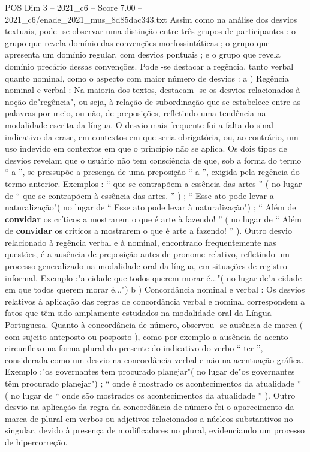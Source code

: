 \begin{textsample}{POS Dim 3 – 2021\_c6 – Score 7.00 – 2021\_c6/enade\_2021\_mus\_8d85dac343.txt}
Assim como na análise dos desvios textuais, pode -se observar uma distinção entre três grupos de participantes : o grupo que revela domínio das convenções morfossintáticas ; o grupo que apresenta um domínio regular, com desvios pontuais ; e o grupo que revela domínio precário dessas convenções.
Pode -se destacar a regência, tanto verbal quanto nominal, como o aspecto com maior número de desvios : a ) Regência nominal e verbal : Na maioria dos textos, destacam -se os desvios relacionados à noção de"regência", ou seja, à relação de subordinação que se estabelece entre as palavras por meio, ou não, de preposições, refletindo uma tendência na modalidade escrita da língua.
O desvio mais frequente foi a falta do sinal indicativo da crase, em contextos em que seria obrigatória, ou, ao contrário, um uso indevido em contextos em que o princípio não se aplica.
Os dois tipos de desvios revelam que o usuário não tem consciência de que, sob a forma do termo “ a ”, se pressupõe a presença de uma preposição “ a ”, exigida pela regência do termo anterior.
Exemplos : “ que se contrapõem a essência das artes ” ( no lugar de “ que se contrapõem à essência das artes. ” ) ; “ Esse ato pode levar a naturalização"( no lugar de “ Esse ato pode levar à naturalização") ; “ Além de \textbf{convidar} os críticos a mostrarem o que é arte à fazendo! ” ( no lugar de “ Além de \textbf{convidar} os críticos a mostrarem o que é arte a fazendo! ” ).
Outro desvio relacionado à regência verbal e à nominal, encontrado frequentemente nas questões, é a ausência de preposição antes de pronome relativo, refletindo um processo generalizado na modalidade oral da língua, em situações de registro informal.
Exemplo :"a cidade que todos querem morar é..."( no lugar de"a cidade em que todos querem morar é...") b ) Concordância nominal e verbal : Os desvios relativos à aplicação das regras de concordância verbal e nominal correspondem a fatos que têm sido amplamente estudados na modalidade oral da Língua Portuguesa.
Quanto à concordância de número, observou -se ausência de marca ( com sujeito anteposto ou posposto ), como por exemplo a ausência de acento circunflexo na forma plural do presente do indicativo do verbo “ ter ”, considerada como um desvio na concordância verbal e não na acentuação gráfica.
Exemplo :"os governantes tem procurado planejar"( no lugar de"os governantes têm procurado planejar") ; “ onde é mostrado os acontecimentos da atualidade ” ( no lugar de “ onde são mostrados os acontecimentos da atualidade ” ).
Outro desvio na aplicação da regra da concordância de número foi o aparecimento da marca de plural em verbos ou adjetivos relacionados a núcleos substantivos no singular, devido à presença de modificadores no plural, evidenciando um processo de hipercorreção.

\end{textsample}
